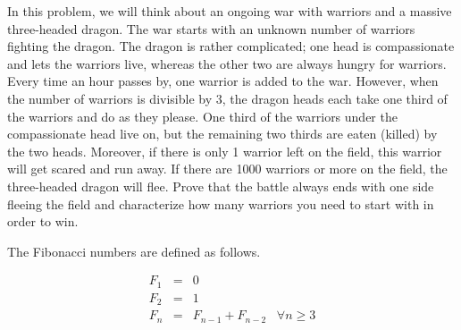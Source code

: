 \documentclass[11pt]{article}
\newif\ifsolutions
\begin{document}
\begin{qunlist}
\ifsolutions
\textbf{Solution:}
For the inductive step we have
$$\frac{(n+1)\cdot r^{n+2}}{r-1}-\frac{r(r^{n+1}-1)}{(r-1)^2}-\frac{n\cdot r^{n+1}}{r-1}+\frac{r(r^n-1)}{(r-1)^2} =
\frac{r^{n+1}((n+1)r(r-1)-r-n(r-1)+1)}{(r-1)^2}
$$
and this can be simplified to
$$r^{n+1}\frac{(r-1)((n+1)r-n-1)}{(r-1)^2}=r^{n+1}\frac{(r-1)^2(n+1)}{(r-1)^2}=(n+1)r^{n+1}$$
\fi



In this problem, we will think about an ongoing war with warriors and a massive three-headed dragon. The war starts with an unknown number of warriors fighting the dragon. The dragon is rather complicated; one head is compassionate and lets the warriors live, whereas the other two are always hungry for warriors. Every time an hour passes by, one warrior is added to the war. However, when the number of warriors is divisible by 3, the dragon heads each take one third of the warriors and do as they please. One third of the warriors under the compassionate head live on, but the remaining two thirds are eaten (killed) by the two heads. Moreover, if there is only 1 warrior left on the field, this warrior will get scared and run away. If there are 1000 warriors or more on the field, the three-headed dragon will flee. Prove that the battle always ends with one side fleeing the field and characterize how many warriors you need to start with in order to win. 

\ifsolutions
\textbf{Solution:} We use strong induction on the number of warriors. If this number is divisible by $3$ we are done in one step (reduce to our hypothesis). Otherwise we are done in either 1 or 2 steps (need to check explicitly).
We can add to our induction hypothesis that the number of warriors never goes up by more than $2$ plus what we started with, and then we can see that we need to have at least $998$ originally. But $998$ and $999$ both reduce to cases that can't go above $333+2$ in two steps. So we need at least $1000$ from the very beginning.
\fi




The Fibonacci numbers are defined as follows.

\begin{eqnarray*}
F_{1} & = & 0\\
F_{2} & = & 1\\
F_{n} & = & F_{n-1}+F_{n-2} \hspace{10pt} \forall n\geq3
\end{eqnarray*}



\end{qunlist}
\end{document}
